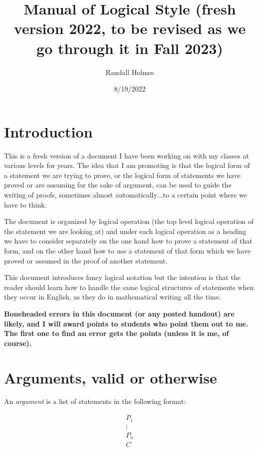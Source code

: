 \documentclass[12pt]{article}
\title{Manual of Logical Style (fresh version 2022, to be revised as we go through it in Fall 2023)}
\author{Randall Holmes}
\date{8/19/2022}
\begin{document}
\maketitle
\tableofcontents


\section{Introduction}

This is a fresh version of a document I have been working on with my classes at various levels for years.  The idea that I am promoting is that the logical form of a statement we are trying to prove, or the logical form of statements we have proved or are assuming for the sake of argument, can be used to guide the writing of proofs, sometimes almost automatically$\ldots$to a certain point where we have to think.

The document is organized by logical operation (the top level logical operation of the statement we are looking at) and under each logical operation as a heading we have to consider separately on the one hand how to prove a statement of that form, and on the other hand how to use a statement of that form which we have proved or assumed in the proof of another statement.

This document introduces fancy logical notation but the intention is that the reader should learn how to handle the same logical structures of statements when they occur in English, as they do in mathematical writing all the time.

{\bf Boneheaded errors in this document (or any posted handout) are likely, and I will award points to students who point them out to me.  The first one to find an error gets the points (unless it is me, of course).}

\section{Arguments, valid or otherwise}

An {\em argument} is a list of statements in the following format:

$$\begin{array}  {c}

P_1 \\

\vdots \\

P_n \\ \hline

C \end{array}$$
\end{document}

